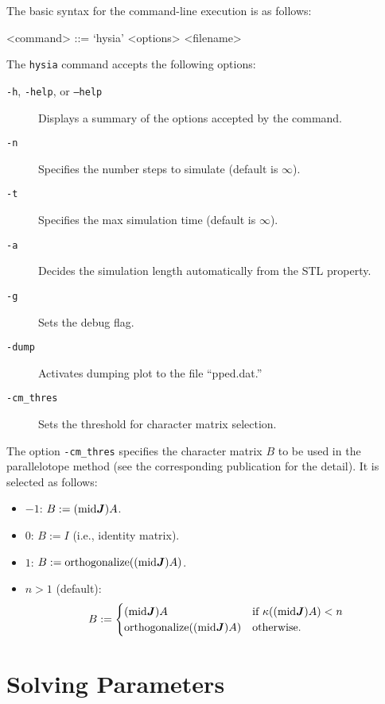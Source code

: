 \documentclass[10pt,a4paper]{article}
\begin{document}
The basic syntax for the command-line execution is as follows:
\begin{grammar}
<command> ::= `hysia' <options> <filename>
\end{grammar}
%
The \texttt{hysia} command accepts the following options:
\begin{description}
\item[\texttt{-h}, \texttt{-help}, or \texttt{--help}] Displays a summary of the options accepted by the command.
\item[\texttt{-n}] Specifies the number steps to simulate (default is $\infty$).
\item[\texttt{-t}] Specifies the max simulation time (default is $\infty$).
\item[\texttt{-a}] Decides the simulation length automatically from the STL property.
\item[\texttt{-g}] Sets the debug flag.
\item[\texttt{-dump}] Activates dumping plot to the file ``pped.dat.''
\item[\texttt{-cm_thres}] Sets the threshold for character matrix selection.
\end{description}

The option \texttt{-cm_thres} specifies the character matrix $B$ to be used in the parallelotope method (see the corresponding publication for the detail). It is selected as follows:
\begin{itemize}
	\item $-1$: $B := (\mathrm{mid}\J) A$.
	\item $0$: $B := I$ (i.e., identity matrix).
	\item $1$: $B := \mathrm{orthogonalize}((\mathrm{mid}\J) A)$.
	\item $n > 1$ (default): 
		\[
			B := \begin{cases}
				(\mathrm{mid}\J) A & \text{if $\kappa((\mathrm{mid}\J) A) < n$} \\
				\mathrm{orthogonalize}((\mathrm{mid}\J) A) & \text{otherwise.}
			\end{cases}
		\]
\end{itemize}


\section{Solving Parameters}
\end{document}
